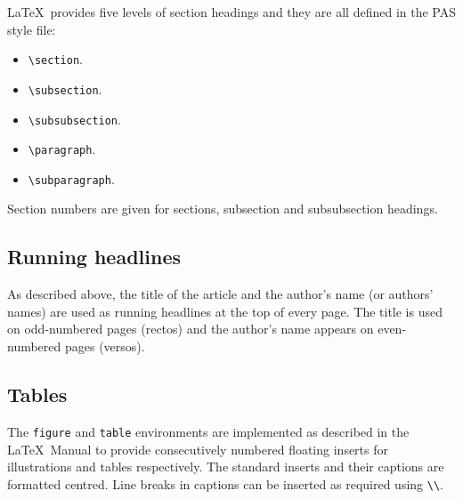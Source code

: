\documentclass{pas}
\begin{document}
\LaTeX\ provides five levels of section headings and they are all
defined in the PAS style file:
\begin{itemize}
  \item \verb"\section".
  \item \verb"\subsection".
  \item \verb"\subsubsection".
  \item \verb"\paragraph".
  \item \verb"\subparagraph".
\end{itemize}
Section numbers are given for sections, subsection and subsubsection headings.

\subsection{Running headlines}

As described above, the title of the article and the author's name (or authors'
names) are used as running headlines at the top of every page.
The title is used on odd-numbered pages (rectos) and the author's name appears
on even-numbered pages (versos).

\subsection{Tables}

The {\tt figure} and {\tt table} environments are implemented as described in
the \LaTeX\ Manual to
provide consecutively numbered floating inserts for illustrations and tables
respectively.
The standard inserts and their captions are formatted centred.
Line breaks in captions can be inserted as required using \verb"\\".
\end{document}
